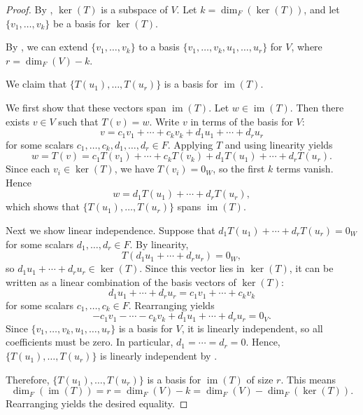 \begin{proof}
    By , $\ker(T)$ is a subspace of $V$. Let $k = \dim_F(\ker(T))$, and let $\{v_1, \dots, v_k\}$ be a basis for $\ker(T)$.

    By , we can extend $\{v_1, \dots, v_k\}$ to a basis $\{v_1, \dots, v_k, u_1, \dots, u_r\}$ for $V$, where $r = \dim_F(V) - k$.

    We claim that $\{T(u_1), \dots, T(u_r)\}$ is a basis for $\operatorname{im}(T)$.

    We first show that these vectors span $\operatorname{im}(T)$. Let $w \in \operatorname{im}(T)$. Then there exists $v \in V$ such that $T(v) = w$. Write $v$ in terms of the basis for $V$:
    $$v = c_1 v_1 + \cdots + c_k v_k + d_1 u_1 + \cdots + d_r u_r$$
    for some scalars $c_1, \dots, c_k, d_1, \dots, d_r \in F$. Applying $T$ and using linearity yields
    $$w = T(v) = c_1 T(v_1) + \cdots + c_k T(v_k) + d_1 T(u_1) + \cdots + d_r T(u_r).$$
    Since each $v_i \in \ker(T)$, we have $T(v_i) = 0_W$, so the first $k$ terms vanish. Hence
    $$w = d_1 T(u_1) + \cdots + d_r T(u_r),$$
    which shows that $\{T(u_1), \dots, T(u_r)\}$ spans $\operatorname{im}(T)$.

    Next we show linear independence. Suppose that $d_1 T(u_1) + \cdots + d_r T(u_r) = 0_W$ for some scalars $d_1, \dots, d_r \in F$. By linearity,
    $$T(d_1 u_1 + \cdots + d_r u_r) = 0_W,$$
    so $d_1 u_1 + \cdots + d_r u_r \in \ker(T)$. Since this vector lies in $\ker(T)$, it can be written as a linear combination of the basis vectors of $\ker(T)$:
    $$d_1 u_1 + \cdots + d_r u_r = c_1 v_1 + \cdots + c_k v_k$$
    for some scalars $c_1, \dots, c_k \in F$. Rearranging yields
    $$-c_1 v_1 - \cdots - c_k v_k + d_1 u_1 + \cdots + d_r u_r = 0_V.$$
    Since $\{v_1, \dots, v_k, u_1, \dots, u_r\}$ is a basis for $V$, it is linearly independent, so all coefficients must be zero. In particular, $d_1 = \cdots = d_r = 0$. Hence, $\{T(u_1), \dots, T(u_r)\}$ is linearly independent by .

    Therefore, $\{T(u_1), \dots, T(u_r)\}$ is a basis for $\operatorname{im}(T)$ of size $r$. This means
    $$\dim_F(\operatorname{im}(T)) = r = \dim_F(V) - k = \dim_F(V) - \dim_F(\ker(T)).$$
    Rearranging yields the desired equality.
\end{proof}
